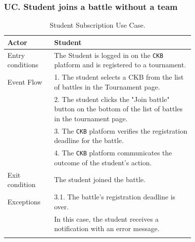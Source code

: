 \subsubsection*{UC\cuc . Student joins a battle without a team}
\begin{center}
    \begin{longtable}{lp{0.75\linewidth}}
        \hline
        Actor            & Student                                                                                                                                                                               \\
        \hline
        Entry conditions & The Student is logged in on the \verb|CKB| platform and is registered to a tournament.                                                                                                            \\
        \hline
        Event Flow       
        & 1. The student selects a CKB from the list of battles in the Tournament page.\\
        & 2. The student clicks the "Join battle" button on the bottom of the list of battles in the tournament page.\\
        & 3. The \verb|CKB| platform verifies the registration deadline for the battle.\\
        & 4. The \verb|CKB| platform communicates the outcome of the student's action.\\
        \hline
        Exit condition   & The student joined the battle.   \\                                                                                                                                                                           
        \hline
        Exceptions   
        & 3.1. The battle's registration deadline is over.\\                                                                                                                                              
            & In this case, the student receives a notification with an error message.   \\                                                               
        \hline
        \caption{Student Subscription Use Case.}
        \label{tab: battle_alone_use_case}
    \end{longtable}

\end{center}

